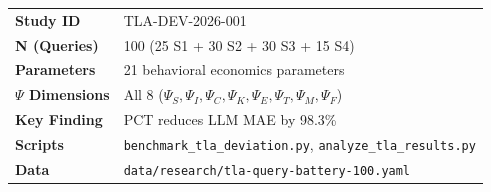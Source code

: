 
\begin{tcolorbox}[colback=falightgray, colframe=fadarkblue, title=Quick Reference]
\begin{tabular}{ll}
\textbf{Study ID} & TLA-DEV-2026-001 \\
\textbf{N (Queries)} & 100 (25 S1 + 30 S2 + 30 S3 + 15 S4) \\
\textbf{Parameters} & 21 behavioral economics parameters \\
\textbf{$\Psi$ Dimensions} & All 8 ($\Psi_S, \Psi_I, \Psi_C, \Psi_K, \Psi_E, \Psi_T, \Psi_M, \Psi_F$) \\
\textbf{Key Finding} & PCT reduces LLM MAE by 98.3\% \\
\textbf{Scripts} & \texttt{benchmark\_tla\_deviation.py}, \texttt{analyze\_tla\_results.py} \\
\textbf{Data} & \texttt{data/research/tla-query-battery-100.yaml} \\
\end{tabular}
\end{tcolorbox}


